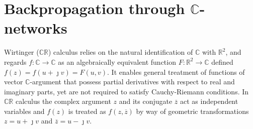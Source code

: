 \documentclass{article}
\newcommand{\real}{\mathbb{R}}
\newcommand{\cplx}{\mathbb{C}}
\newcommand{\iu}{{\jmath}}
\newcommand{\conj}[1]{\overline{#1}}
\begin{document}

\section{Backpropagation through $\cplx$-networks} %
\label{sub:wirtinger_calculus}

Wirtinger ($\cplx\real$) calculus relies on the natural identification of $\cplx$ with $
  \real^2
$, and regards $
  f\colon \cplx \to \cplx
$ as an algebraically equivalent function $F\colon \real^2 \to \cplx$ defined $
  f(z) = f(u + \iu v) = F(u, v)
$. It enables general treatment of functions of vector $\cplx$-argument that possess partial
derivatives with respect to real and imaginary parts, yet are not required to satisfy
Cauchy-Riemann conditions. In $\cplx\real$ calculus the complex argument $z$ and its
conjugate $\conj{z}$ act as independent variables and $f(z)$ is treated as $f(z, \conj{z})$
by way of geometric transformations $z = u + \iu v$ and $\conj{z} = u - \iu v$.
\end{document}
